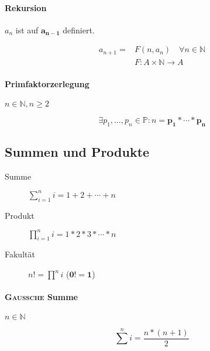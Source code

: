 \paragraph{Rekursion} $a_n$ ist auf $\mathbf{a_{n-1}}$ definiert.

\begin{align*}
  a_{n+1} = & F(n, a_n) \quad \forall n \in \mathbb{N} \\
            & F: A \times \mathbb{N} \rightarrow A
\end{align*}

\paragraph{Primfaktorzerlegung} $n\in \mathbb{N}, n \geq 2$

$$\exists p_1, \dots, p_n \in \mathbb{P}: n = \mathbf{p_1 * \cdots * p_n}$$

\subsection{Summen und Produkte}

\begin{description}
  \item [Summe] $\sum_{i = 1}^n i = 1 + 2 + \cdots + n$

  \item [Produkt] $\prod_{i = 1}^n i = 1 * 2 * 3 * \cdots * n$

  \item [Fakultät] $n! = \prod^n i$ ($\mathbf{0! = 1}$)
\end{description}

\paragraph{\textsc{Gaussche} Summe} $n \in \mathbb{N}$

\begin{mzImportant}
  $$\sum^n i = \frac{n * (n + 1)}{2}$$
\end{mzImportant}

